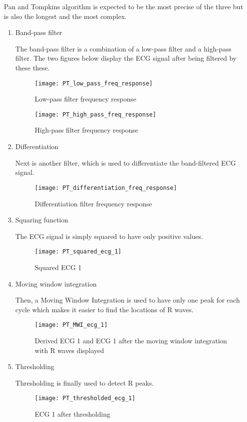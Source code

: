 \documentclass[11pt]{article}
\begin{document}
    Pan and Tompkins algorithm is expected to be the most precise of the three but is also the longest and the most complex.
    
    \setlength{\jot}{10pt}
	\begin{enumerate}
	\item Band-pass filter 
	
	The band-pass filter is a combination of a low-pass filter and a high-pass filter. The two figures below display the ECG signal after being filtered by these these.
	
	\begin{figure}[H]
	\centering
	\texttt{[image: PT\_low\_pass\_freq\_response]}
	\caption{Low-pass filter frequency response}
	\end{figure} 
	
	\begin{figure}[H]
	\centering
	\texttt{[image: PT\_high\_pass\_freq\_response]}
	\caption{High-pass filter frequency response}
	\end{figure} 

	\item Differentiation 
	
	Next is another filter, which is used to differentiate the band-filtered ECG signal.
	
	\begin{figure}[H]
	\centering
	\texttt{[image: PT\_differentiation\_freq\_response]}
	\caption{Differentiation filter frequency response}
	\end{figure} 
	
	\item Squaring function 
	
	The ECG signal is simply squared to have only positive values.
	
	\begin{figure}[H]
	\centering
	\texttt{[image: PT\_squared\_ecg\_1]}
	\caption{Squared ECG 1}
	\end{figure} 
	
	\item Moving window integration 
	
	Then, a Moving Window Integration is used to have only one peak for each cycle which makes it easier to find the locations of R waves.
	
	\begin{figure}[H]
	\centering
	\texttt{[image: PT\_MWI\_ecg\_1]}
	\caption{Derived ECG 1 and ECG 1 after the moving window integration with R waves displayed}
	\end{figure} 
	
	\item Thresholding
	
	Thresholding is finally used to detect R peaks.
	
	\begin{figure}[H]
	\centering
	\texttt{[image: PT\_thresholded\_ecg\_1]}
	\caption{ECG 1 after thresholding}
	\end{figure} 
		
	\end{enumerate}
	\vspace{8pt}
    
\end{document}
